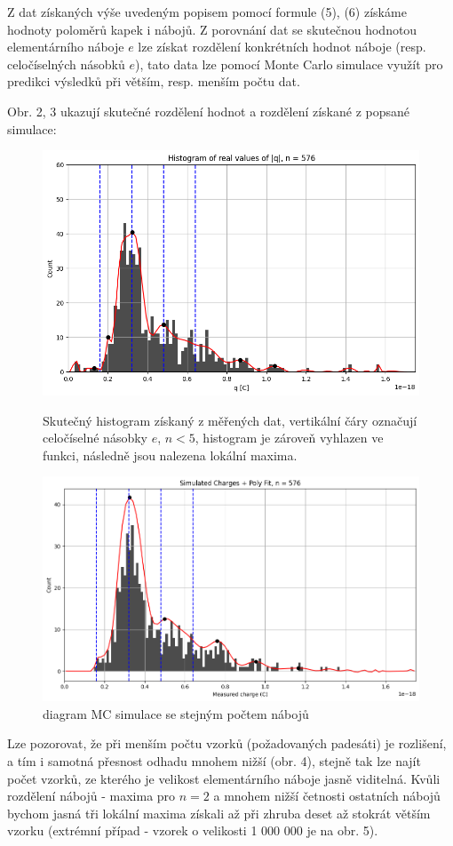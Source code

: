 \documentclass[czech,11pt,a4paper]{article}
\begin{document}
\begin{multicols}{2}
		Z dat získaných výše uvedeným popisem pomocí formule (5), (6) získáme hodnoty poloměrů kapek i nábojů. Z porovnání dat se skutečnou hodnotou elementárního náboje $e$ lze získat rozdělení konkrétních hodnot náboje (resp. celočíselných násobků $e$), tato data lze pomocí Monte Carlo simulace využít pro predikci výsledků při větším, resp. menším počtu dat.
		
		Obr. 2, 3 ukazují skutečné rozdělení hodnot a rozdělení získané z popsané simulace:
		\begin{figure}[H]
			\centering
			\includegraphics[width=0.8\linewidth]{histogramreal}
			\caption{Skutečný histogram získaný z měřených dat, vertikální čáry označují celočíselné násobky $e$, $n <5$, histogram je zároveň vyhlazen ve funkci, následně jsou nalezena lokální maxima.}
			\includegraphics[width=0.8\linewidth]{histogramMC1}
			\caption{diagram MC simulace se stejným počtem nábojů}
		\end{figure}
		 Lze pozorovat, že při menším počtu vzorků (požadovaných padesáti) je rozlišení, a tím i samotná přesnost odhadu mnohem nižší (obr. 4), stejně tak lze najít počet vzorků, ze kterého je velikost elementárního náboje jasně viditelná. Kvůli rozdělení nábojů - maxima pro $n=2$ a mnohem nižší četnosti ostatních nábojů bychom jasná tři lokální maxima získali až při zhruba deset až stokrát větším vzorku (extrémní případ - vzorek o velikosti 1 000 000 je na obr. 5).
		 

\end{multicols}
\end{document}

